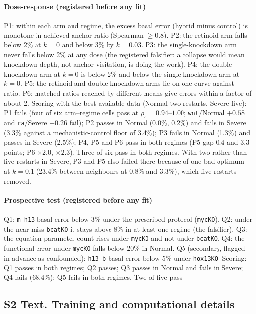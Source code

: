 \paragraph{Dose-response (registered before any fit)} P1: within each arm and
regime, the excess basal error (hybrid minus control) is monotone in achieved
anchor ratio (Spearman $\ge 0.8$). P2: the retinoid arm falls below 2\% at $k=0$
and below 3\% by $k=0.03$. P3: the single-knockdown arm never falls below 2\% at
any dose (the registered falsifier: a collapse would mean knockdown depth, not
anchor visitation, is doing the work). P4: the double-knockdown arm at $k=0$ is
below 2\% and below the single-knockdown arm at $k=0$. P5: the retinoid and
double-knockdown arms lie on one curve against ratio. P6: matched ratios reached
by different means give errors within a factor of about 2. Scoring with the best
available data (Normal two restarts, Severe five): P1 fails (four of six
arm--regime cells pass at $\rho_s=0.94$--$1.00$; \texttt{wnt}/Normal $+0.58$ and
\texttt{ra}/Severe $+0.26$ fail); P2 passes in Normal (0.0\%, 0.2\%) and fails in
Severe (3.3\% against a mechanistic-control floor of 3.4\%); P3 fails in Normal
(1.3\%) and passes in Severe (2.5\%); P4, P5 and P6 pass in both regimes (P5 gap
0.4 and 3.3 points; P6 $\times2.0$, $\times2.3$). Three of six pass in both
regimes. With two rather than five restarts in Severe, P3 and P5 also failed
there because of one bad optimum at $k=0.1$ (23.4\% between neighbours at 0.8\%
and 3.3\%), which five restarts removed.

\paragraph{Prospective test (registered before any fit)} Q1: \texttt{m\_h13}
basal error below 3\% under the prescribed protocol (\texttt{mycKO}). Q2: under
the near-miss \texttt{bcatKO} it stays above 8\% in at least one regime (the
falsifier). Q3: the equation-parameter count rises under \texttt{mycKO} and not
under \texttt{bcatKO}. Q4: the functional error under \texttt{mycKO} falls below
20\% in Normal. Q5 (secondary, flagged in advance as confounded): \texttt{h13\_b}
basal error below 5\% under \texttt{hox13KO}. Scoring: Q1 passes in both regimes;
Q2 passes; Q3 passes in Normal and fails in Severe; Q4 fails (68.4\%); Q5 fails
in both regimes. Two of five pass.

\subsection*{S2 Text. Training and computational details}

